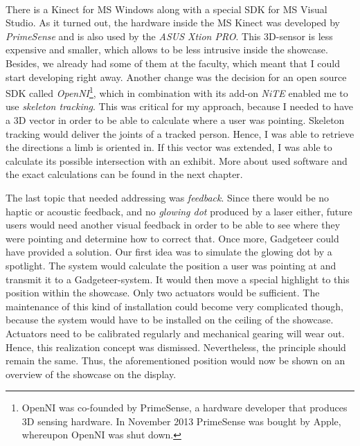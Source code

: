\\
There is a Kinect for \ac{MS} Windows along with a special \ac{SDK} for \ac{MS} Visual Studio. As it turned out, the hardware inside the \ac{MS} Kinect was developed by \textit{PrimeSense} and is also used by the \textit{ASUS Xtion PRO}. This \ac{3D}-sensor is less expensive and smaller, which allows to be less intrusive inside the showcase. Besides, we already had some of them at the faculty, which meant that I could start developing right away. Another change was the decision for an open source \ac{SDK} called \textit{OpenNI}\footnote{OpenNI was co-founded by PrimeSense, a hardware developer that produces \ac{3D} sensing hardware. In November 2013 PrimeSense was bought by Apple, whereupon OpenNI was shut down.}, which in combination with its add-on \textit{NiTE} enabled me to use \textit{skeleton tracking}. This was critical for my approach, because I needed to have a \ac{3D} vector in order to be able to calculate where a user was pointing. Skeleton tracking would deliver the joints of a tracked person. Hence, I was able to retrieve the directions a limb is oriented in. If this vector was extended, I was able to calculate its possible intersection with an exhibit. More about used software and the exact calculations can be found in the next chapter.

The last topic that needed addressing was \textit{feedback}. Since there would be no haptic or acoustic feedback, and no \textit{glowing dot} produced by a laser either, future users would need another visual feedback in order to be able to see where they were pointing and determine how to correct that. Once more, Gadgeteer could have provided a solution. Our first idea was to simulate the glowing dot by a spotlight. The system would calculate the position a user was pointing at and transmit it to a Gadgeteer-system. It would then move a special highlight to this position within the showcase. Only two actuators would be sufficient. The maintenance of this kind of installation could become very complicated though, because the system would have to be installed on the ceiling of the showcase. Actuators need to be calibrated regularly and mechanical gearing will wear out. Hence, this realization concept was dismissed. Nevertheless, the principle should remain the same. Thus, the aforementioned position would now be shown on an overview of the showcase on the display.

